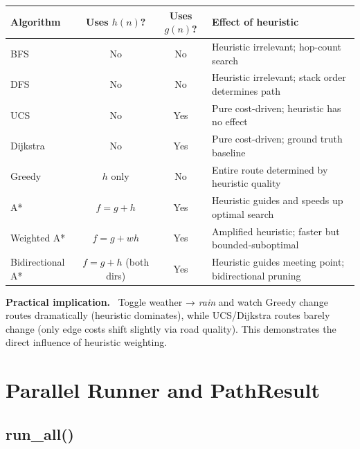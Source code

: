 \documentclass[11pt,a4paper]{article}
\newenvironment{notebox}[1][Note]{%
  \begin{mdframed}[backgroundcolor=notebox,linecolor=blue!40,linewidth=1pt]%
  \textbf{#1.}\ }{\end{mdframed}}
\begin{document}
\begin{table}[H]
\centering\small
\begin{tabular}{lccl}
\toprule
\textbf{Algorithm} & \textbf{Uses $h(n)$?} & \textbf{Uses $g(n)$?} & \textbf{Effect of heuristic} \\
\midrule
BFS & No & No & Heuristic irrelevant; hop-count search \\
DFS & No & No & Heuristic irrelevant; stack order determines path \\
UCS & No & Yes & Pure cost-driven; heuristic has no effect \\
Dijkstra & No & Yes & Pure cost-driven; ground truth baseline \\
Greedy & $h$ only & No & Entire route determined by heuristic quality \\
A* & $f=g+h$ & Yes & Heuristic guides and speeds up optimal search \\
Weighted A* & $f=g+wh$ & Yes & Amplified heuristic; faster but bounded-suboptimal \\
Bidirectional A* & $f=g+h$ (both dirs) & Yes & Heuristic guides meeting point; bidirectional pruning \\
\bottomrule
\end{tabular}
\end{table}

\begin{notebox}[Practical implication]
Toggle weather → \textit{rain} and watch Greedy change routes dramatically (heuristic dominates), while UCS/Dijkstra routes barely change (only edge costs shift slightly via road quality). This demonstrates the direct influence of heuristic weighting.
\end{notebox}

\section{Parallel Runner and PathResult}

\subsection{run\_all()}
\end{document}
